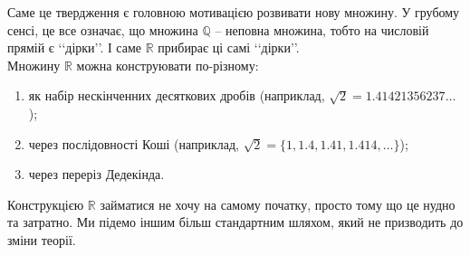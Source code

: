 \documentclass[a4paper, 14pt]{article}
\theoremstyle{theoremdd}
\theoremstyle{theoremdd}
\theoremstyle{theoremdd}
\theoremstyle{theoremdd}
\theoremstyle{theoremdd}
\theoremstyle{theoremdd}
\theoremstyle{theoremdd}
\theoremstyle{theoremdd}
\begin{document}
	Саме це твердження є головною мотивацією розвивати нову множину. У грубому сенсі, це все означає, що множина $\mathbb{Q}$ -- неповна множина, тобто на числовій прямій є \lq\lq дірки\rq\rq. І саме $\mathbb{R}$ прибирає ці самі  \lq\lq дірки\rq\rq . \\
	Множину $\mathbb{R}$ можна конструювати по-різному:
	\begin{enumerate}[nosep,wide=0pt,label={\arabic*)}]
	\item як набір нескінченних десяткових дробів (наприклад, $\sqrt{2} = 1.41421356237\dots$);
	\item через послідовності Коші (наприклад, $\sqrt{2} = \{1, 1.4, 1.41, 1.414, \dots\}$);
	\item через переріз Дедекінда.
	\end{enumerate}
	Конструкцією $\mathbb{R}$ займатися не хочу на самому початку, просто тому що це нудно та затратно. Ми підемо іншим більш стандартним шляхом, який не призводить до зміни теорії.
	
\end{document}

